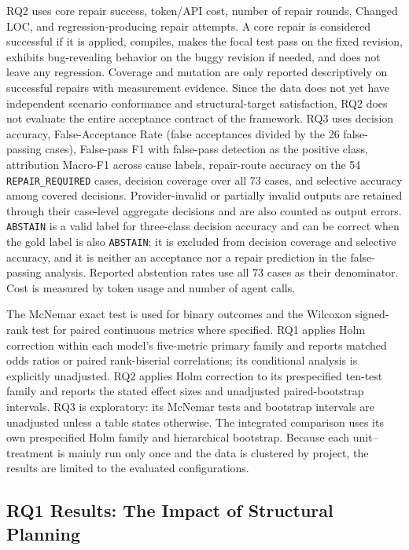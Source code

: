 \documentclass[pdflatex,sn-basic,Numbered,iicol]{sn-jnl}
\begin{document}
RQ2 uses core repair success, token/API cost, number of repair rounds, Changed LOC, and regression-producing repair attempts. A core repair is considered successful if it is applied, compiles, makes the focal test pass on the fixed revision, exhibits bug-revealing behavior on the buggy revision if needed, and does not leave any regression. Coverage and mutation are only reported descriptively on successful repairs with measurement evidence. Since the data does not yet have independent scenario conformance and structural-target satisfaction, RQ2 does not evaluate the entire acceptance contract of the framework. RQ3 uses decision accuracy, False-Acceptance Rate (false acceptances divided by the 26 false-passing cases), False-pass F1 with false-pass detection as the positive class, attribution Macro-F1 across cause labels, repair-route accuracy on the 54 \texttt{REPAIR\_REQUIRED} cases, decision coverage over all 73 cases, and selective accuracy among covered decisions. Provider-invalid or partially invalid outputs are retained through their case-level aggregate decisions and are also counted as output errors. \texttt{ABSTAIN} is a valid label for three-class decision accuracy and can be correct when the gold label is also \texttt{ABSTAIN}; it is excluded from decision coverage and selective accuracy, and it is neither an acceptance nor a repair prediction in the false-passing analysis. Reported abstention rates use all 73 cases as their denominator. Cost is measured by token usage and number of agent calls.

The McNemar exact test is used for binary outcomes and the Wilcoxon signed-rank test for paired continuous metrics where specified. RQ1 applies Holm correction within each model's five-metric primary family and reports matched odds ratios or paired rank-biserial correlations; its conditional analysis is explicitly unadjusted. RQ2 applies Holm correction to its prespecified ten-test family and reports the stated effect sizes and unadjusted paired-bootstrap intervals. RQ3 is exploratory: its McNemar tests and bootstrap intervals are unadjusted unless a table states otherwise. The integrated comparison uses its own prespecified Holm family and hierarchical bootstrap. Because each unit--treatment is mainly run only once and the data is clustered by project, the results are limited to the evaluated configurations.

\subsection{RQ1 Results: The Impact of Structural Planning}\label{subsec:rq1}
\end{document}
